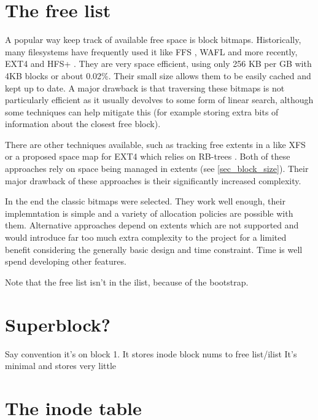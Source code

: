     \section{The free list}
        \label{sec_free_list}

        A popular way keep track of available free space is block bitmaps.
        Historically, many filesystems have frequently used it like FFS
        \cite{FFS}, WAFL \cite{WAFL} and more recently, EXT4
        \cite{ext4_space_maps} and HFS+ \cite{HFSplus}.  They are very space
        efficient, using only 256 KB per GB with 4KB blocks or about 0.02\%.
        Their small size allows them to be easily cached and kept up to date. A
        major drawback is that traversing these bitmaps is not particularly
        efficient as it usually devolves to some form of linear search,
        although some techniques can help mitigate this (for example storing
        extra bits of information about the closest free block).

        There are other techniques available, such as tracking free extents in
        a \bplustree like XFS \cite{XFS_scalability} or a proposed space map
        for EXT4 which relies on RB-trees \cite{ext4_space_maps}. Both of these
        approaches rely on space being managed in extents (see
        \ref{sec_block_size}).  Their major drawback of these approaches is
        their significantly increased complexity.

        In the end the classic bitmaps were selected. They work well enough,
        their implemntation is simple and a variety of allocation policies are
        possible with them. Alternative approaches depend on extents which are
        not supported and would introduce far too much extra complexity to the
        project for a limited benefit considering the generally basic design
        and time constraint. Time is well spend developing other features.

        Note that the free list isn't in the ilist, because of the bootstrap.

    \section{Superblock?}

        Say convention it's on block 1. It stores inode block nums to free list/ilist
        It's minimal and stores very little

    \section{The inode table}

